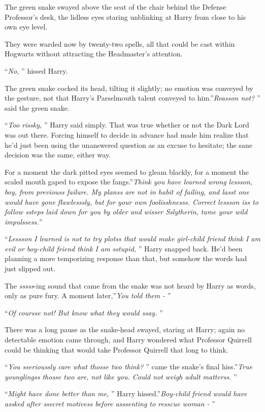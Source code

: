 The green snake swayed above the seat of the chair behind the Defense
Professor's desk, the lidless eyes staring unblinking at Harry from
close to his own eye level.

They were warded now by twenty-two spells, all that could be cast within
Hogwarts without attracting the Headmaster's attention.

``\emph{No,} '' hissed Harry.

The green snake cocked its head, tilting it slightly; no emotion was
conveyed by the gesture, not that Harry's Parselmouth talent conveyed to
him.''\emph{Reasson not?} '' said the green snake.

``\emph{Too rissky,} '' Harry said simply. That was true whether or not
the Dark Lord was out there. Forcing himself to decide in advance had
made him realize that he'd just been using the unanswered question as an
excuse to hesitate; the sane decision was the same, either way.

For a moment the dark pitted eyes seemed to gleam blackly, for a moment
the scaled mouth gaped to expose the fangs.''\emph{Think you have
learned wrong lessson, boy, from previouss failure. My planss are not in
habit of failing, and lasst one would have gone flawlesssly, but for
your own foolisshnesss. Correct lessson iss to follow ssteps laid down
for you by older and wisser Sslytherin, tame your wild impulssess.''}

``\emph{Lessson I learned is not to try plotss that would make girl-child
friend think I am evil or boy-child friend think I am sstupid,} '' Harry
snapped back. He'd been planning a more temporizing response than that,
but somehow the words had just slipped out.

The \emph{sssss}-ing sound that came from the snake was not heard by
Harry as words, only as pure fury. A moment later,''\emph{You told them
-} ''

``\emph{Of coursse not! But know what they would ssay.} ''

There was a long pause as the snake-head swayed, staring at Harry; again
no detectable emotion came through, and Harry wondered what Professor
Quirrell could be thinking that would take Professor Quirrell that long
to think.

``\emph{You sserioussly care what thosse two think?} '' came the snake's
final hiss.''\emph{True younglingss thosse two are, not like you. Could
not weigh adult matterss.} ''

``\emph{Might have done better than me,} '' Harry hissed.''\emph{Boy-child
friend would have assked after ssecret motivess before asssenting to
resscue woman -} ''

